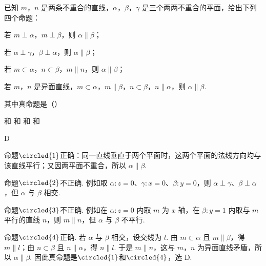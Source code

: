 \begin{problem}
已知 \(m\)，\(n\) 是两条不重合的直线，\(\alpha\)，\(\beta\)，\(\gamma\) 是三个两两不重合的平面，给出下列四个命题：

\begin{circlelist}
\item 若 \(m \perp \alpha\)，\(m \perp \beta\)，则 \(\alpha \parallel \beta\)；
\item 若 \(\alpha \perp \gamma\)，\(\beta \perp \alpha\)，则 \(\alpha \parallel \beta\)；
\item 若 \(m \subset \alpha\)，\(n \subset \beta\)，\(m \parallel n\)，则 \(\alpha \parallel \beta\)；
\item 若 \(m\)，\(n\) 是异面直线，\(m \subset \alpha\)，\(m \parallel \beta\)，\(n \subset \beta\)，\(n \parallel \alpha\)，则 \(\alpha \parallel \beta\).
\end{circlelist}

其中真命题是（\quad）

\choices
    {和}
    {和}
    {和}
    {和}

\begin{answer}
D
\end{answer}

\begin{solution}
命题\(\circled{1}\)正确：同一直线垂直于两个平面时，这两个平面的法线方向均与该直线平行；又因两平面不重合，所以 \(\alpha\parallel\beta\).

命题\(\circled{2}\)不正确. 例如取 \(\alpha:z=0\)、\(\gamma:x=0\)、\(\beta:y=0\)，则 \(\alpha\perp\gamma\)、\(\beta\perp\alpha\)，但 \(\alpha\) 与 \(\beta\) 相交.

命题\(\circled{3}\)不正确. 例如在 \(\alpha:z=0\) 内取 \(m\) 为 \(x\) 轴，在 \(\beta:y=1\) 内取与 \(m\) 平行的直线 \(n\)，则 \(m\parallel n\)，但 \(\alpha\) 与 \(\beta\) 不平行.

命题\(\circled{4}\)正确. 若 \(\alpha\) 与 \(\beta\) 相交，设交线为 \(l\). 由 \(m\subset\alpha\) 且 \(m\parallel\beta\)，得 \(m\parallel l\)；由 \(n\subset\beta\) 且 \(n\parallel\alpha\)，得 \(n\parallel l\). 于是 \(m\parallel n\)，这与 \(m\)，\(n\) 为异面直线矛盾，所以 \(\alpha\parallel\beta\). 因此真命题是\(\circled{1}\)和\(\circled{4}\)，选 D.
\end{solution}
\end{problem}

